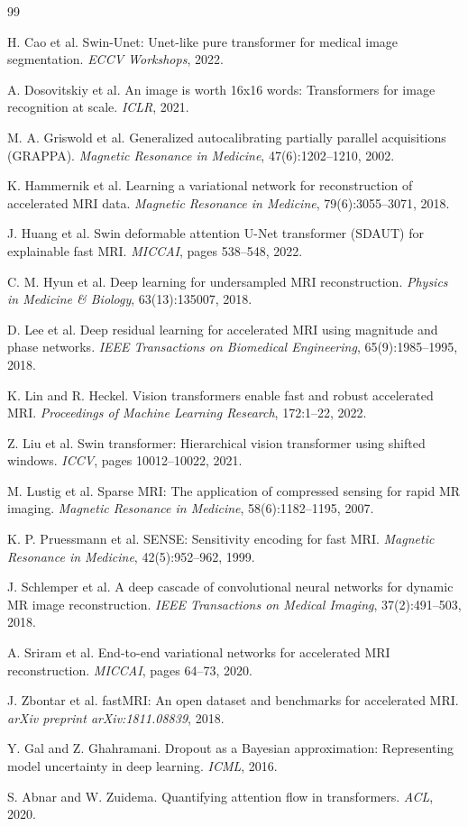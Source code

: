 \documentclass[11pt]{article}
\begin{document}
\begin{thebibliography}{99}
\small

 H. Cao et al. Swin-Unet: Unet-like pure transformer for
medical image segmentation. \emph{ECCV Workshops}, 2022.

 A. Dosovitskiy et al. An image is worth 16x16 words:
Transformers for image recognition at scale. \emph{ICLR}, 2021.

 M. A. Griswold et al. Generalized autocalibrating
partially parallel acquisitions (GRAPPA). \emph{Magnetic Resonance in
Medicine}, 47(6):1202--1210, 2002.

 K. Hammernik et al. Learning a variational network for
reconstruction of accelerated MRI data. \emph{Magnetic Resonance in Medicine},
79(6):3055--3071, 2018.

 J. Huang et al. Swin deformable attention U-Net transformer
(SDAUT) for explainable fast MRI. \emph{MICCAI}, pages 538--548, 2022.

 C. M. Hyun et al. Deep learning for undersampled MRI
reconstruction. \emph{Physics in Medicine \& Biology}, 63(13):135007, 2018.

 D. Lee et al. Deep residual learning for accelerated MRI
using magnitude and phase networks. \emph{IEEE Transactions on Biomedical
Engineering}, 65(9):1985--1995, 2018.

 K. Lin and R. Heckel. Vision transformers enable fast and
robust accelerated MRI. \emph{Proceedings of Machine Learning Research},
172:1--22, 2022.

 Z. Liu et al. Swin transformer: Hierarchical vision
transformer using shifted windows. \emph{ICCV}, pages 10012--10022, 2021.

 M. Lustig et al. Sparse MRI: The application of compressed
sensing for rapid MR imaging. \emph{Magnetic Resonance in Medicine},
58(6):1182--1195, 2007.

 K. P. Pruessmann et al. SENSE: Sensitivity encoding for
fast MRI. \emph{Magnetic Resonance in Medicine}, 42(5):952--962, 1999.

 J. Schlemper et al. A deep cascade of convolutional
neural networks for dynamic MR image reconstruction. \emph{IEEE Transactions on
Medical Imaging}, 37(2):491--503, 2018.

 A. Sriram et al. End-to-end variational networks for
accelerated MRI reconstruction. \emph{MICCAI}, pages 64--73, 2020.

 J. Zbontar et al. fastMRI: An open dataset and benchmarks
for accelerated MRI. \emph{arXiv preprint arXiv:1811.08839}, 2018.

 Y. Gal and Z. Ghahramani. Dropout as a Bayesian
approximation: Representing model uncertainty in deep learning. \emph{ICML},
2016.

 S. Abnar and W. Zuidema. Quantifying attention flow in
transformers. \emph{ACL}, 2020.

\end{thebibliography}
\end{document}
